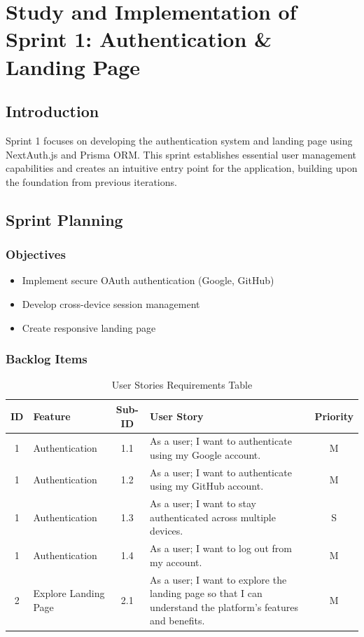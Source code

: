\chapter[Sprint 1]{Study and Implementation of Sprint 1: Authentication \& Landing Page}

\section{Introduction}
Sprint 1 focuses on developing the authentication system and landing page using NextAuth.js and Prisma ORM. This sprint establishes essential user management capabilities and creates an intuitive entry point for the application, building upon the foundation from previous iterations.

\section{Sprint Planning}

\subsection{Objectives}
\begin{itemize}
    \item Implement secure OAuth authentication (Google, GitHub)
    \item Develop cross-device session management
    \item Create responsive landing page
\end{itemize}
\subsection{Backlog Items}


\begin{table}[H]
    \centering
    \begin{tabular}{|c|l|c|p{8cm}|c|}
    \hline
    \textbf{ID} & \textbf{Feature} & \textbf{Sub-ID} & \textbf{User Story} & \textbf{Priority} \\
    \hline
    1 & Authentication & 1.1 & As a user; I want to authenticate using my Google account. & M \\
    \hline
    1  & Authentication & 1.2 & As a user; I want to authenticate using my GitHub account. & M \\
    \hline
    1  & Authentication & 1.3 & As a user; I want to stay authenticated across multiple devices. & S \\
    \hline
    1  & Authentication & 1.4 & As a user; I want to log out from my account. & M \\
    \hline
    2 & Explore Landing Page & 2.1 & As a user; I want to explore the landing page so that I can understand the platform's features and benefits. & M \\
    \hline
    \end{tabular}
    \caption{User Stories Requirements Table}
    \label{tab:user_stories}
    \end{table}
